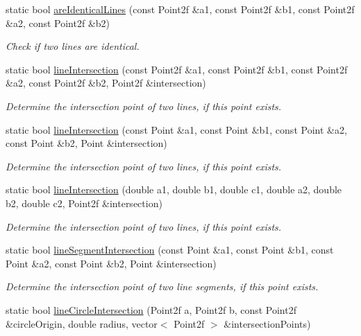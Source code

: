 \begin{DoxyCompactItemize}
static bool \hyperlink{classmultiscale_1_1Geometry2D_a718faf02b261c9ccbedf9d7b0e19ada1}{are\-Identical\-Lines} (const Point2f \&a1, const Point2f \&b1, const Point2f \&a2, const Point2f \&b2)
\begin{DoxyCompactList}\small\item\em Check if two lines are identical. \end{DoxyCompactList}\item 
static bool \hyperlink{classmultiscale_1_1Geometry2D_aae24e97b32bdd8dab88c880d0d25ec86}{line\-Intersection} (const Point2f \&a1, const Point2f \&b1, const Point2f \&a2, const Point2f \&b2, Point2f \&intersection)
\begin{DoxyCompactList}\small\item\em Determine the intersection point of two lines, if this point exists. \end{DoxyCompactList}\item 
static bool \hyperlink{classmultiscale_1_1Geometry2D_aa9d9b17a7e5098c8bde0cd9d3dc08dc2}{line\-Intersection} (const Point \&a1, const Point \&b1, const Point \&a2, const Point \&b2, Point \&intersection)
\begin{DoxyCompactList}\small\item\em Determine the intersection point of two lines, if this point exists. \end{DoxyCompactList}\item 
static bool \hyperlink{classmultiscale_1_1Geometry2D_a51a867b90c8492ce4ce85c227788678b}{line\-Intersection} (double a1, double b1, double c1, double a2, double b2, double c2, Point2f \&intersection)
\begin{DoxyCompactList}\small\item\em Determine the intersection point of two lines, if this point exists. \end{DoxyCompactList}\item 
static bool \hyperlink{classmultiscale_1_1Geometry2D_a9931c3d8089d658186a8c1ac78db5773}{line\-Segment\-Intersection} (const Point \&a1, const Point \&b1, const Point \&a2, const Point \&b2, Point \&intersection)
\begin{DoxyCompactList}\small\item\em Determine the intersection point of two line segments, if this point exists. \end{DoxyCompactList}\item 
static bool \hyperlink{classmultiscale_1_1Geometry2D_ab04c08f83d066f0d936d516d015ea62c}{line\-Circle\-Intersection} (Point2f a, Point2f b, const Point2f \&circle\-Origin, double radius, vector$<$ Point2f $>$ \&intersection\-Points)

\end{DoxyCompactItemize}
